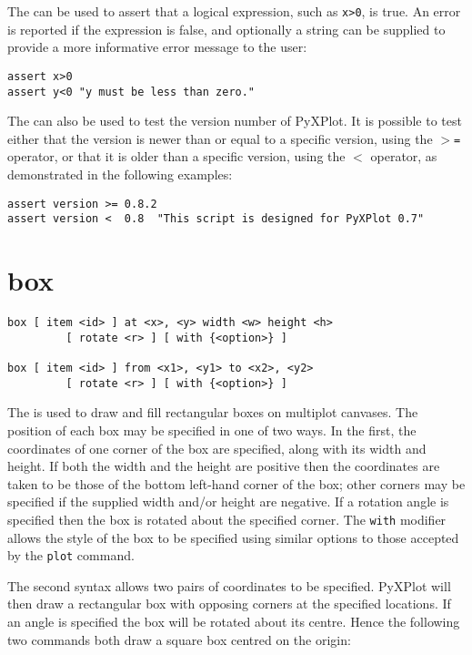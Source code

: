 The  can be used to assert that a logical expression, such as
{\tt x>0}, is true. An error is reported if the expression is false, and
optionally a string can be supplied to provide a more informative error message 
to the user:

\begin{verbatim}
assert x>0
assert y<0 "y must be less than zero."
\end{verbatim}

The  can also be used to test the version number of PyXPlot. It
is possible to test either that the version is newer than or equal to a
specific version, using the {\tt $>$=} operator, or that it is older than a
specific version, using the {\tt $<$} operator, as demonstrated in the
following examples:

\begin{verbatim}
assert version >= 0.8.2
assert version <  0.8  "This script is designed for PyXPlot 0.7"
\end{verbatim}


\section{box}

\begin{verbatim}
box [ item <id> ] at <x>, <y> width <w> height <h>
         [ rotate <r> ] [ with {<option>} ]

box [ item <id> ] from <x1>, <y1> to <x2>, <y2>
         [ rotate <r> ] [ with {<option>} ]
\end{verbatim}

The  is used to draw and fill rectangular boxes on multiplot
canvases.  The position of each box may be specified in one of two ways.  In the
first, the coordinates of one corner of the box are specified, along with its
width and height. If both the width and the height are positive then the
coordinates are taken to be those of the bottom left-hand corner of the box;
other corners may be specified if the supplied width and/or height are
negative. If a rotation angle is specified then the box is rotated about the
specified corner.  The {\tt with} modifier allows the style of the box to be
specified using similar options to those accepted by the {\tt plot} command.

The second syntax allows two pairs of coordinates to be specified.  PyXPlot
will then draw a rectangular box with opposing corners at the specified
locations.  If an angle is specified the box will be rotated about its centre.
Hence the following two commands both draw a square box centred on the origin:

